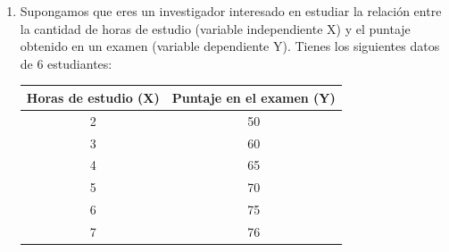 \documentclass{article} %
\newcommand{\bigtable}[1]{{\fontsize{30pt}{36pt}\selectfont\renewcommand{\arraystretch}{2}#1}}
\begin{document}
{\begin{enumerate}
    \[
    \sum_{i=1}^{N} Y_i^2 = 678, \quad \sum_{i=1}^{N} (Y_i - \bar{Y})^2 = 150
    \]

    \begin{enumerate}
        \item (3 puntos) ¿Cuál es el tamaño de la muestra?\\
    
        \item (9 puntos) Calcule los estimadores de MCO del modelo anterior.\\
        \textbf{Hint:} \( Z = \begin{pmatrix} A &{\bf 0} \\ {\bf 0} & B \end{pmatrix} \) con \( A \) y \( B \) matrices cuadradas, entonces:\[Z^{-1} = \begin{pmatrix} A^{-1} & {\bf 0} \\{\bf 0} & B^{-1} \end{pmatrix}\]

        \item (4 puntos) Indique la ecuación del modelo predicho e interprete.

        \item (4 puntos) ¿Qué debería suceder con $R^2$ si agregamos más variables independientes a la medición?
        
    \end{enumerate}

\item  Supongamos que eres un investigador interesado en estudiar la relación entre la cantidad de horas de estudio (variable independiente X) y el puntaje obtenido en un examen (variable dependiente Y).
Tienes los siguientes datos de 6 estudiantes:

\bigtable{
\begin{tabular}{|c|c|}
\hline
\textbf{Horas de estudio (X)} & \textbf{Puntaje en el examen (Y)} \\
\hline
2 & 50 \\
3 & 60 \\
4 & 65 \\
5 & 70 \\
6 & 75 \\
7 & 76 \\
\hline
\end{tabular}
}


\end{enumerate}}
\end{document}
